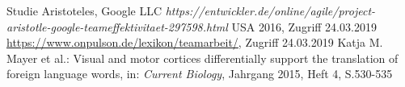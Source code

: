 \documentclass[12pt]{scrartcl}
\begin{document}
\renewcommand{\bibname}{Literaturverzeichnis}
\begin{thebibliography}{1}
   Studie Aristoteles, Google LLC {\em https://entwickler.de/online/agile/project-aristotle-google-teameffektivitaet-297598.html} USA 2016, Zugriff 24.03.2019
   \url{https://www.onpulson.de/lexikon/teamarbeit/}, Zugriff 24.03.2019
   Katja M. Mayer et al.: \glqq Visual and motor cortices differentially support the translation of foreign language words\grqq, in: \textit{Current Biology}, Jahrgang 2015, Heft 4, S.530-535
\end{thebibliography}
\end{document}
